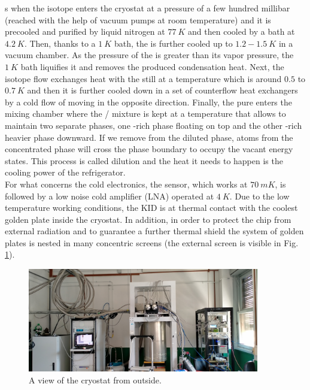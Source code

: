 \documentclass[12pt]{article}
\begin{document}
s when the isotope enters the cryostat at a pressure of a few hundred millibar (reached with the help of vacuum pumps at room temperature) and it is precooled and purified by liquid nitrogen at $77~K$ and then cooled by a  bath at $4.2~K$. Then, thanks to a $1~K$ bath, the  is further cooled up to $1.2-1.5~K$ in a vacuum chamber. As the pressure of the  is greater than its vapor pressure, the $1~K$ bath liquifies it and removes the produced condensation heat. Next, the isotope flow exchanges heat with the still at a temperature which is around $0.5$ to $0.7~K$ and then it is further cooled down in a set of counterflow heat exchangers by a cold flow of  moving in the opposite direction. Finally, the pure  enters the mixing chamber where the / mixture is kept at a temperature that allows to maintain two separate phases, one -rich phase floating on top and the other -rich heavier phase downward. If we remove  from the diluted phase,  atoms from the concentrated phase will cross the phase boundary to occupy the vacant energy states. This process is called dilution and the heat it needs to happen is the cooling power of the refrigerator.\\
For what concerns the cold electronics, the sensor, which works at $70~mK$, is followed by a low noise cold amplifier (LNA) operated at $4~K$. Due to the low temperature working conditions, the KID is at thermal contact with the coolest golden plate inside the cryostat. In addition, in order to protect the chip from external radiation and to guarantee a further thermal shield the system of golden plates is nested in many concentric screens (the external screen is visible in Fig. \ref{fig:Stanza}).
\begin{figure}[H]
\centering
\includegraphics[width=0.9\textwidth]{stanza.jpg}
\caption{\label{fig:Stanza} A view of the cryostat from outside.}
\end{figure}
\end{document}
